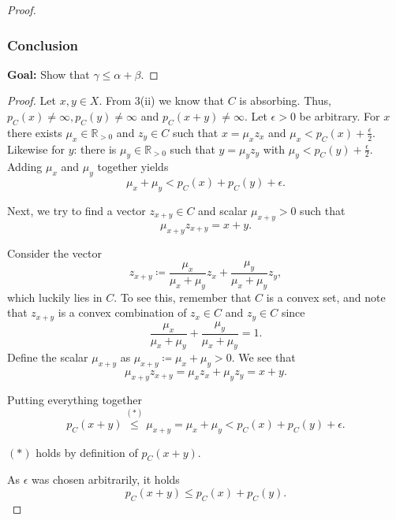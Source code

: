 \documentclass[a4paper]{article}
\renewcommand{\hline}{\noindent\makebox[\linewidth]{\rule{12cm}{1pt}}}
\begin{document}
\begin{enumerate}[label=(\roman*)]
\begin{proof}
       
       \subsubsection*{Conclusion}    
		
		\textbf{Goal:} Show that $\gamma \leq \alpha + \beta$.
    \end{proof}
    \fi
       
    \begin{proof}
    	Let $x,y \in X$. From 3(ii) we know that $C$ is absorbing. Thus, $p_C(x) \neq \infty, p_C(y) \neq \infty$ and $p_C(x+y) \neq \infty$. Let $\epsilon> 0$ be arbitrary. For $x$ there exists $\mu_x \in \mathbb R_{> 0}$ and $z_y \in C$ such that $x = \mu_x z_x$ and $\mu_x < p_C(x) + \frac{\epsilon}{2}$. Likewise for $y$: there is $\mu_y \in \mathbb R_{>0}$ such that $y = \mu_y z_y$ with $\mu_y < p_C(y) + \frac{\epsilon}{2}$. Adding $\mu_x$ and $\mu_y$ together yields
    	\[
    		\mu_x + \mu_y < p_C(x) + p_C(y) + \epsilon.
    	\]
    	
    	\begin{goal}{}{}
    	Next, we try to find a vector $z_{x+y} \in C$ and scalar $\mu_{x+y} > 0$ such that $$\mu_{x+y} z_{x+y} = x+y.$$
    	\end{goal}
    	Consider the vector
    	\[
    		z_{x+y} \coloneqq \frac{\mu_x}{\mu_x + \mu_y}z_x + \frac{\mu_y}{\mu_x + \mu_y}z_y,
    	\]
    	which luckily lies in $C$. To see this, remember that $C$ is a convex set, and note that $z_{x+y}$ is a convex combination of $z_x \in C$ and $z_y \in C$ since
    	\[
    		 \frac{\mu_x}{\mu_x + \mu_y} + \frac{\mu_y}{\mu_x + \mu_y} = 1.
    	\]
    	Define the scalar $\mu_{x+y}$ as $\mu_{x+y} \coloneqq \mu_x + \mu_y > 0$. We see that
    	\[
    		\mu_{x+y}z_{x+y} = \mu_x z_x + \mu_y z_y = x+y.
    	\]
    	    	
    	Putting everything together
    	\[
    		p_C(x+y) \overset{(*)}{\leq} \mu_{x+y} = \mu_x + \mu_y < p_C(x) + p_C(y) + \epsilon.
    	\] 
    	
    	\begin{explanation}{}{}
    	$(*)$ holds by definition of $p_C(x+y)$.
    	\end{explanation}    	
    	
    	As $\epsilon$ was chosen arbitrarily, it holds
    	\[
    		p_C(x+y) \leq  p_C(x) + p_C(y).
    	\]
    	
    	 \end{proof}
    	
    	\hline
    	

\end{enumerate}
\end{document}
